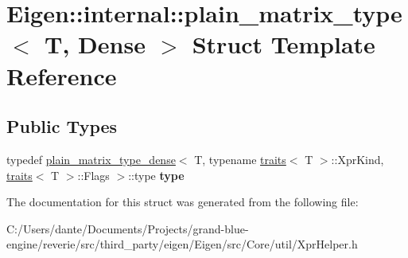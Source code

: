 \hypertarget{struct_eigen_1_1internal_1_1plain__matrix__type_3_01_t_00_01_dense_01_4}{}\section{Eigen\+::internal\+::plain\+\_\+matrix\+\_\+type$<$ T, Dense $>$ Struct Template Reference}
\label{struct_eigen_1_1internal_1_1plain__matrix__type_3_01_t_00_01_dense_01_4}
\subsection*{Public Types}
\begin{DoxyCompactItemize}
\item 
\mbox{\label{struct_eigen_1_1internal_1_1plain__matrix__type_3_01_t_00_01_dense_01_4_a0d64fab828a74bd90079074e27353145}} 
typedef \mbox{\hyperlink{struct_eigen_1_1internal_1_1plain__matrix__type__dense}{plain\+\_\+matrix\+\_\+type\+\_\+dense}}$<$ T, typename \mbox{\hyperlink{struct_eigen_1_1internal_1_1traits}{traits}}$<$ T $>$\+::Xpr\+Kind, \mbox{\hyperlink{struct_eigen_1_1internal_1_1traits}{traits}}$<$ T $>$\+::Flags $>$\+::type {\bfseries type}
\end{DoxyCompactItemize}


The documentation for this struct was generated from the following file\+:\begin{DoxyCompactItemize}
\item 
C\+:/\+Users/dante/\+Documents/\+Projects/grand-\/blue-\/engine/reverie/src/third\+\_\+party/eigen/\+Eigen/src/\+Core/util/Xpr\+Helper.\+h\end{DoxyCompactItemize}
